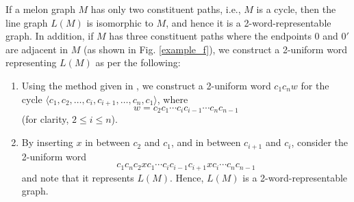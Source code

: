 \documentclass{llncs}
\begin{document}
If a melon graph $M$ has only two constituent paths, i.e., $M$ is a cycle, then the line graph $L(M)$ is isomorphic to $M$, and hence it is a 2-word-representable graph. In addition, if $M$ has three constituent paths where the endpoints $0$ and $0'$ are adjacent in $M$ (as shown in Fig. \ref{example_f}), we construct a 2-uniform word representing $L(M)$ as per the following:
\begin{enumerate}	
	\item Using the method given in \cite[Section 3.2]{kitaev15mono}, we construct a 2-uniform word $c_1c_nw$ for the cycle $\langle c_1, c_2, \ldots, c_i, c_{i+1}, \ldots,  c_n, c_1 \rangle$, where
	\[w = c_2 c_1 \cdots c_i c_{i-1} \cdots c_{n} c_{n-1} \] (for clarity, $2 \le i \le n$).	
	\item By inserting $x$ in between $c_2$ and $c_1$, and in between $c_{i+1}$ and $c_i$, consider the 2-uniform word 
	\[ c_1 c_n c_2 x c_1  \cdots c_i c_{i-1} c_{i+1} x  c_i \cdots  c_{n} c_{n-1} \]	
	and note that it represents $L(M)$. Hence, $L(M)$ is a 2-word-representable graph.
\end{enumerate}
\end{document}
